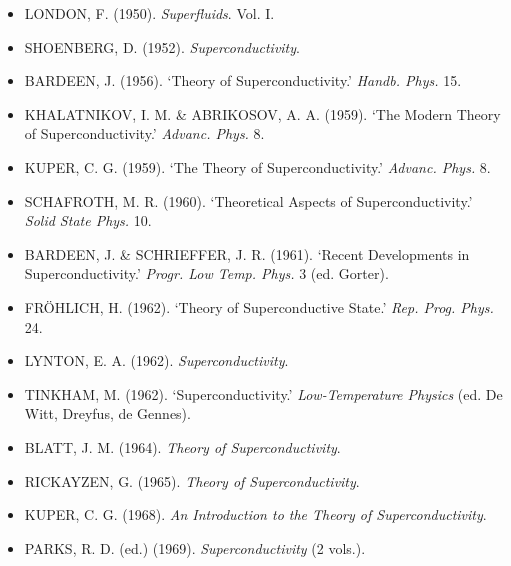 \begin{itemize}[leftmargin=2em, itemsep=0.2em]
\item LONDON, F. (1950). \emph{Superfluids}. Vol. I.
\item SHOENBERG, D. (1952). \emph{Superconductivity}.
\item BARDEEN, J. (1956). `Theory of Superconductivity.' \emph{Handb. Phys.} 15.
\item KHALATNIKOV, I. M. \& ABRIKOSOV, A. A. (1959). `The Modern Theory of Superconductivity.' \emph{Advanc. Phys.} 8.
\item KUPER, C. G. (1959). `The Theory of Superconductivity.' \emph{Advanc. Phys.} 8.
\item SCHAFROTH, M. R. (1960). `Theoretical Aspects of Superconductivity.' \emph{Solid State Phys.} 10.
\item BARDEEN, J. \& SCHRIEFFER, J. R. (1961). `Recent Developments in Superconductivity.' \emph{Progr. Low Temp. Phys.} 3 (ed. Gorter).
\item FRÖHLICH, H. (1962). `Theory of Superconductive State.' \emph{Rep. Prog. Phys.} 24.
\item LYNTON, E. A. (1962). \emph{Superconductivity}.
\item TINKHAM, M. (1962). `Superconductivity.' \emph{Low-Temperature Physics} (ed. De Witt, Dreyfus, de Gennes).
\item BLATT, J. M. (1964). \emph{Theory of Superconductivity}.
\item RICKAYZEN, G. (1965). \emph{Theory of Superconductivity}.
\item KUPER, C. G. (1968). \emph{An Introduction to the Theory of Superconductivity}.
\item PARKS, R. D. (ed.) (1969). \emph{Superconductivity} (2 vols.).
\end{itemize}
